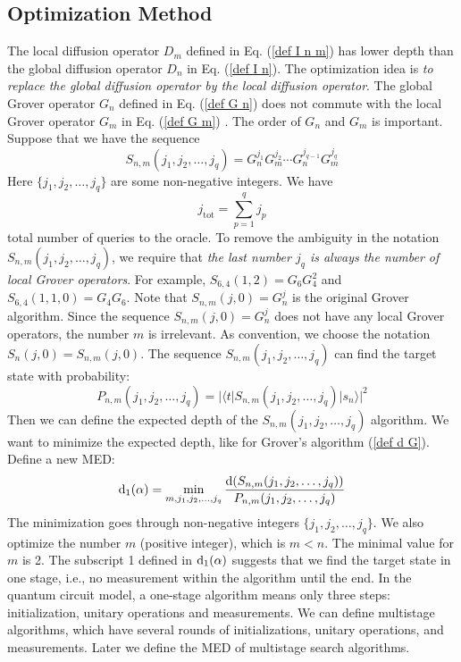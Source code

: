\documentclass[%
 twocolumn,
 10pt,
 superscriptaddress,
 longbibliography,
 amsmath,amssymb,
 aps,
 pra,
floatfix,
]{revtex4-1}
\newcommand{\eq}{\begin{equation}}
\newcommand{\en}{\end{equation}}
\begin{document}
\subsection{\label{subsec: opt method} Optimization Method}

The local diffusion operator $D_m$ defined in Eq. (\ref{def I n m}) has lower depth than the global diffusion operator $D_n$ in Eq. (\ref{def I n}). The optimization idea is \textit{to replace the global diffusion operator by the local diffusion operator}. The global Grover operator $G_n$ defined in Eq. (\ref{def G n}) does not commute with the local Grover operator $G_m$ in Eq. (\ref{def G m}) \cite{KV06}. The order of $G_n$ and $G_m$ is important. Suppose that we have the sequence
\begin{equation}
\label{def S n m}
   S_{n,m}(j_1,j_2,\ldots,j_q) = G_n^{j_1}G_m^{j_{2}}\cdots G_n^{j_{q-1}}G_m^{j_q} 
\end{equation}
Here $\{j_1,j_2,\ldots,j_q\}$ are some non-negative integers. We have 
\begin{equation}
    j_\text{tot} = \sum_{p=1}^q j_{p}
\end{equation}
total number of queries to the oracle. To remove the ambiguity in the notation $S_{n,m}(j_1,j_2,\ldots,j_q)$, we require that \textit{the last number $j_q$ is always the number of local Grover operators}. For example, $S_{6,4}(1,2) = G_6G^2_4$ and $S_{6,4}(1,1,0) = G_4G_6$. Note that $S_{n,m}(j,0)=G^j_n$ is the original Grover algorithm. Since the sequence $S_{n,m}(j,0)=G^j_n$ does not have any local Grover operators, the number $m$ is irrelevant. As convention, we choose the notation $S_{n}(j,0)=S_{n,m}(j,0)$. The sequence $S_{n,m}(j_1,j_2,\ldots,j_q)$ can find the target state with probability:
\eq
P_{n,m}(j_1,j_2,\ldots,j_q) = |\langle t|S_{n,m}(j_1,j_2,\ldots,j_q)|s_n\rangle|^2
\en
Then we can define the expected depth of the $S_{n,m}(j_1,j_2,\ldots,j_q)$ algorithm. We want to minimize the expected depth, like for Grover's algorithm (\ref{def d G}). Define a new MED:
\begin{equation}
\label{d 1 G}
   {\rm d}_1(\alpha) = \min_{m,j_1,j_2,\ldots,j_q} \frac{{\rm d}(S_{n,m}(j_1,j_2,\ldots,j_q))}{P_{n,m}(j_1,j_2,\ldots,j_q)}
\end{equation}
The minimization goes through non-negative integers $\{j_1,j_2,\ldots,j_q\}$. We also optimize the number $m$ (positive integer), which is $m<n$. The minimal value for $m$ is 2. The subscript 1 defined in $\text d_1(\alpha)$ suggests that we find the target state in one stage, i.e., no measurement within the algorithm until the end. In the quantum circuit model, a one-stage algorithm means only three steps: initialization, unitary operations and measurements. We can define multistage algorithms, which have several rounds of initializations, unitary operations, and measurements. Later we define the MED of multistage search algorithms.
\end{document}
